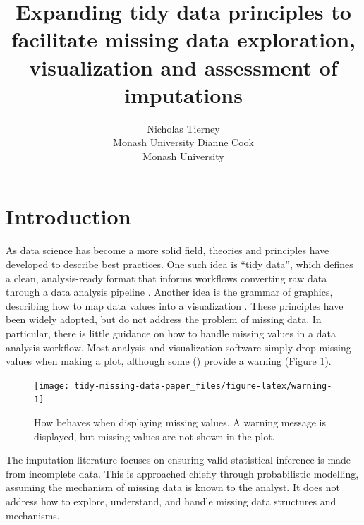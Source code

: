 \documentclass[
]{jss}
\author{
Nicholas Tierney\\Monash University \And Dianne Cook\\Monash University
}
\title{Expanding tidy data principles to facilitate missing data exploration, visualization and assessment of imputations}
\begin{document}
\hypertarget{intro}{%
\section{Introduction}\label{intro}}

As data science has become a more solid field, theories and principles have developed to describe best practices. One such idea is ``tidy data'', which defines a clean, analysis-ready format that informs workflows converting raw data through a data analysis pipeline \citep{Wickham2014}. Another idea is the grammar of graphics, describing how to map data values into a visualization \citep{Wilkinson2012}. These principles have been widely adopted, but do not address the problem of missing data. In particular, there is little guidance on how to handle missing values in a data analysis workflow. Most analysis and visualization software simply drop missing values when making a plot, although some () provide a warning (Figure \ref{fig:warning}).

\begin{CodeChunk}
\begin{figure}

{\centering \texttt{[image: tidy-missing-data-paper\_files/figure-latex/warning-1]} 

}

\caption[How  behaves when displaying missing values]{How  behaves when displaying missing values. A warning message is displayed, but missing values are not shown in the plot.}\label{fig:warning}
\end{figure}
\end{CodeChunk}

The imputation literature focuses on ensuring valid statistical inference is made from incomplete data. This is approached chiefly through probabilistic modelling, assuming the mechanism of missing data is known to the analyst. It does not address how to explore, understand, and handle missing data structures and mechanisms.
\end{document}
